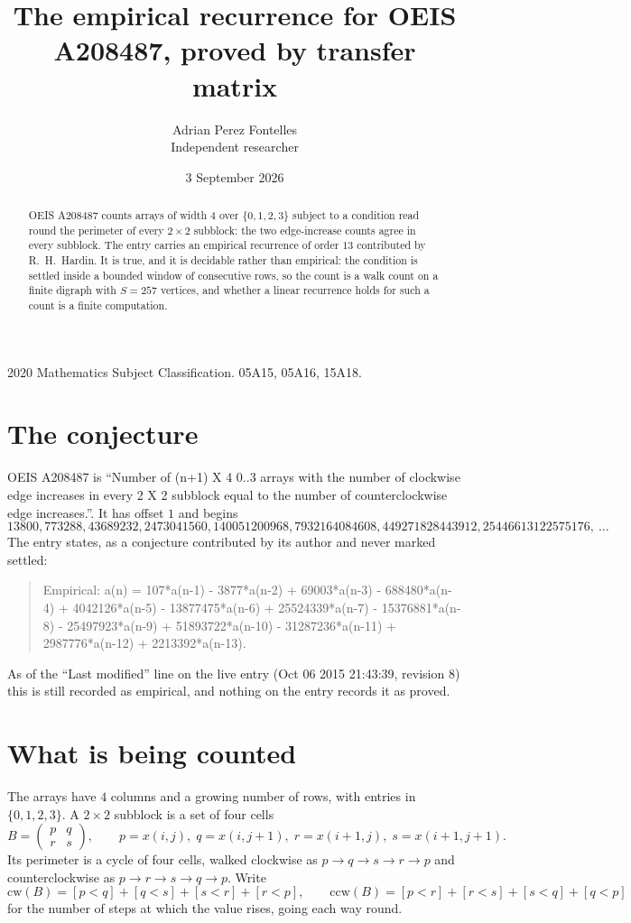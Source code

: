 \documentclass[11pt,a4paper]{article}
\title{The empirical recurrence for OEIS A208487, proved by transfer matrix}
\author{Adrian Perez Fontelles\\ \small Independent researcher}
\date{3 September 2026}
\theoremstyle{plain}
\theoremstyle{definition}
\begin{document}
\maketitle

\begin{abstract}
OEIS A208487 counts arrays of width $4$ over $\{0,1,2,3\}$ subject to a condition read round the
perimeter of every $2\times2$ subblock: the two edge-increase counts agree in every subblock. The entry carries an empirical recurrence of
order $13$ contributed by R.~H.~Hardin. It is true, and it is decidable rather than
empirical: the condition is settled inside a bounded window of consecutive rows, so the
count is a walk count on a finite digraph with $S=257$ vertices, and whether a linear
recurrence holds for such a count is a finite computation.
\end{abstract}

\noindent\small 2020 Mathematics Subject Classification. 05A15, 05A16, 15A18.\normalsize

\section{The conjecture}

OEIS A208487 is ``Number of (n+1) X 4 0..3 arrays with the number of clockwise edge increases in every 2 X 2 subblock equal to the number of counterclockwise edge increases.''. It has offset $1$ and begins
\[
13800, 773288, 43689232, 2473041560, 140051200968, 7932164084608, 449271828443912, 25446613122575176,\ \dots
\]
The entry states, as a conjecture contributed by its author and never marked settled:
\begin{quote}
Empirical: a(n) = 107*a(n-1) - 3877*a(n-2) + 69003*a(n-3) - 688480*a(n-4) + 4042126*a(n-5) - 13877475*a(n-6) + 25524339*a(n-7) - 15376881*a(n-8) - 25497923*a(n-9) + 51893722*a(n-10) - 31287236*a(n-11) + 2987776*a(n-12) + 2213392*a(n-13).
\end{quote}
As of the ``Last modified'' line on the live entry (Oct 06 2015 21:43:39, revision 8) this is still
recorded as empirical, and nothing on the entry records it as proved.

\section{What is being counted}

The arrays have $4$ columns and a growing number of rows, with entries in $\{0,1,2,3\}$. A
$2\times2$ subblock is a set of four cells
\[
B=\begin{pmatrix} p & q \\ r & s \end{pmatrix},
\qquad p=x(i,j),\; q=x(i,j+1),\; r=x(i+1,j),\; s=x(i+1,j+1).
\]
Its perimeter is a cycle of four cells, walked clockwise as $p\to q\to s\to r\to p$ and
counterclockwise as $p\to r\to s\to q\to p$. Write
\[
\mathrm{cw}(B)=[p<q]+[q<s]+[s<r]+[r<p],\qquad
\mathrm{ccw}(B)=[p<r]+[r<s]+[s<q]+[q<p]
\]
for the number of steps at which the value rises, going each way round.
\end{document}
